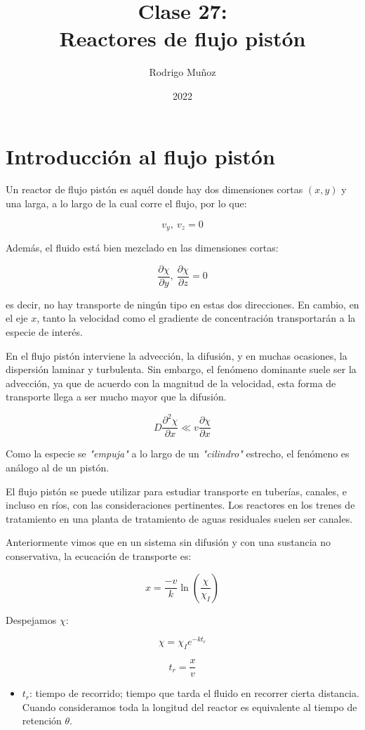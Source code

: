 \documentclass[11pt]{article}
\title{Clase 27: \\ Reactores de flujo pistón}
\author{Rodrigo Muñoz}
\date{2022}
\begin{document}
\maketitle

\section{Introducción al flujo pistón}

Un reactor de flujo pistón es aquél donde hay dos dimensiones cortas \( \left( x , y \right) \) y una larga, a lo largo de la cual corre el flujo, por lo que:

\[ v_y , \ v_z = 0 \]

Además, el fluido está bien mezclado en las dimensiones cortas:

\[ \frac{ \partial \chi }{ \partial y } , \ \frac{ \partial \chi }{ \partial z } = 0 \]

es decir, no hay transporte de ningún tipo en estas dos direcciones. En cambio, en el eje \( x \), tanto la velocidad como el gradiente de concentración transportarán a la especie de interés.

En el flujo pistón interviene la advección, la difusión, y en muchas ocasiones, la dispersión laminar y turbulenta. Sin embargo, el fenómeno dominante suele ser la advección, ya que de acuerdo con la magnitud de la velocidad, esta forma de transporte llega a ser mucho mayor que la difusión.

\[ D \frac{ \partial ^ 2 \chi }{ \partial x } \ll v \frac{ \partial \chi }{ \partial x } \]

Como la especie se \textit{"empuja"} a lo largo de un \textit{"cilindro"} estrecho, el fenómeno es análogo al de un pistón.

El flujo pistón se puede utilizar para estudiar transporte en tuberías, canales, e incluso en ríos, con las consideraciones pertinentes. Los reactores en los trenes de tratamiento en una planta de tratamiento de aguas residuales suelen ser canales.

Anteriormente vimos que en un sistema sin difusión y con una sustancia no conservativa, la ecucación de transporte es:

\[ x = \frac{ -v }{ k } \ln \left( \frac{ \chi }{ \chi_I } \right) \]

Despejamos \( \chi \):

\[ \boxed{ \chi = \chi_I e ^ { - k t_r } } \]

\[ t_r = \frac{x}{v} \]

\begin{itemize}
    \item \( t_r \): tiempo de recorrido; tiempo que tarda el fluido en recorrer cierta distancia. Cuando consideramos toda la longitud del reactor es equivalente al tiempo de retención \( \theta \).
\end{itemize}
\end{document}
